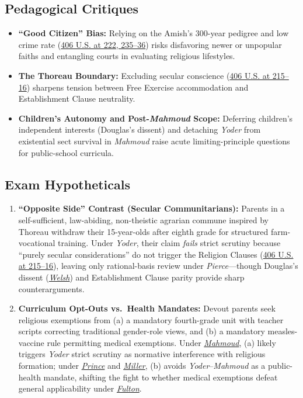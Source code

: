 \documentclass[12pt]{article}
\begin{document}
\subsection{Pedagogical Critiques}
\begin{itemize}
  \item \textbf{``Good Citizen'' Bias:} Relying on the Amish's 300-year pedigree and low crime rate (\href{https://supreme.justia.com/cases/federal/us/406/205/}{406 U.S. at 222, 235--36}) risks disfavoring newer or unpopular faiths and entangling courts in evaluating religious lifestyles.
  \item \textbf{The Thoreau Boundary:} Excluding secular conscience (\href{https://supreme.justia.com/cases/federal/us/406/205/}{406 U.S. at 215--16}) sharpens tension between Free Exercise accommodation and Establishment Clause neutrality.
  \item \textbf{Children's Autonomy and Post-\emph{Mahmoud} Scope:} Deferring children's independent interests (Douglas's dissent) and detaching \emph{Yoder} from existential sect survival in \emph{Mahmoud} raise acute limiting-principle questions for public-school curricula.
\end{itemize}

\subsection{Exam Hypotheticals}
\begin{enumerate}
  \item \textbf{``Opposite Side'' Contrast (Secular Communitarians):} Parents in a self-sufficient, law-abiding, non-theistic agrarian commune inspired by Thoreau withdraw their 15-year-olds after eighth grade for structured farm-vocational training. Under \emph{Yoder}, their claim \emph{fails} strict scrutiny because ``purely secular considerations'' do not trigger the Religion Clauses (\href{https://supreme.justia.com/cases/federal/us/406/205/}{406 U.S. at 215--16}), leaving only rational-basis review under \emph{Pierce}---though Douglas's dissent (\href{https://supreme.justia.com/cases/federal/us/398/333/}{\emph{Welsh}}) and Establishment Clause parity provide sharp counterarguments.
  \item \textbf{Curriculum Opt-Outs vs.\ Health Mandates:} Devout parents seek religious exemptions from (a) a mandatory fourth-grade unit with teacher scripts correcting traditional gender-role views, and (b) a mandatory measles-vaccine rule permitting medical exemptions. Under \href{https://www.law.cornell.edu/supremecourt/text/24-297}{\emph{Mahmoud}}, (a) likely triggers \emph{Yoder} strict scrutiny as normative interference with religious formation; under \href{https://supreme.justia.com/cases/federal/us/321/158/}{\emph{Prince}} and \href{https://law.justia.com/cases/federal/appellate-courts/ca2/24-681/24-681-2026-06-30.html}{\emph{Miller}}, (b) avoids \emph{Yoder}--\emph{Mahmoud} as a public-health mandate, shifting the fight to whether medical exemptions defeat general applicability under \href{https://www.law.cornell.edu/supremecourt/text/19-123}{\emph{Fulton}}.
\end{enumerate}
\end{document}
